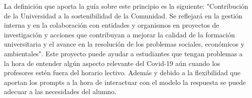 La definición que aporta la guía sobre este principio es la siguiente: "Contribución de la Universidad a la sostenibilidad de la Comunidad. Se reflejará en la gestión interna y en la colaboración con entidades y organismos en proyectos de investigación y acciones que contribuyan a mejorar la calidad de la formación universitaria y el avance en la resolución de los problemas sociales, económicos y ambientales". Este proyecto puede ayudar a estudiantes que tengan problemas a la hora de entender algún aspecto relevante del Covid-19 aún cuando los profesores estén fuera del horario lectivo. Además y debido a la flexibilidad que aportan los prompts a la hora de interactuar con el modelo la respuesta se puede adecuar a las necesidades del alumno.\cite{CRUE_2005}